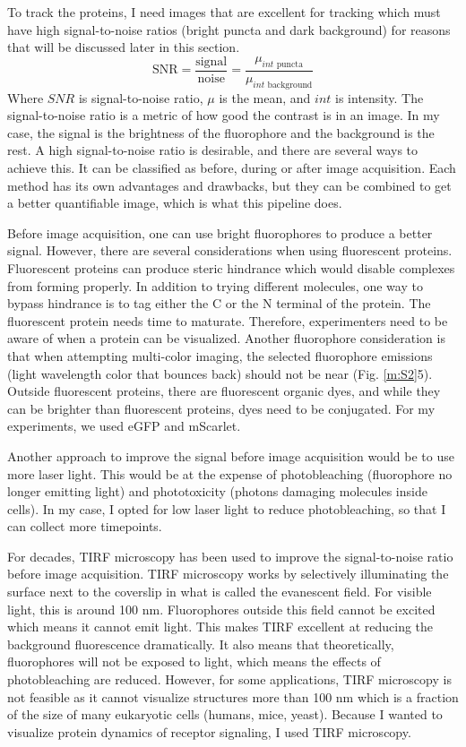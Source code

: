 To track the proteins, I need images that are excellent for tracking which must have high signal-to-noise ratios (bright puncta and dark background) for reasons that will be discussed later in this section.
\begin{equation}
\text{SNR} = \frac{\text{signal}}{\text{noise}} = \frac{\mu_{int\text{ puncta}}}{\mu_{int \text{ background}}}
\end{equation} 
Where $SNR$ is signal-to-noise ratio, $\mu$ is the mean, and $int$ is intensity.
The signal-to-noise ratio is a metric of how good the contrast is in an image. In my case, the signal is the brightness of the fluorophore and the background is the rest. A high signal-to-noise ratio is desirable, and there are several ways to achieve this. It can be classified as before, during or after image acquisition. Each method has its own advantages and drawbacks, but they can be combined to get a better quantifiable image, which is what this pipeline does.

Before image acquisition, one can use bright fluorophores to produce a better signal. However, there are several considerations when using fluorescent proteins. Fluorescent proteins can produce steric hindrance which would disable complexes from forming properly. In addition to trying different molecules, one way to bypass hindrance is to tag either the C or the N terminal of the protein. The fluorescent protein needs time to maturate. Therefore, experimenters need to be aware of when a protein can be visualized. Another fluorophore consideration is that when attempting multi-color imaging, the selected fluorophore emissions (light wavelength color that bounces back) should not be near (Fig. \ref{m:S2}5). Outside fluorescent proteins, there are fluorescent organic dyes, and while they can be brighter than fluorescent proteins, dyes need to be conjugated. For my experiments, we used eGFP and mScarlet.

Another approach to improve the signal before image acquisition would be to use more laser light. This would be at the expense of photobleaching (fluorophore no longer emitting light) and phototoxicity (photons damaging molecules inside cells). In my case, I opted for low laser light to reduce photobleaching, so that I can collect more timepoints.

For decades, TIRF microscopy has been used to improve the signal-to-noise ratio before image acquisition. TIRF microscopy works by selectively illuminating the surface next to the coverslip in what is called the evanescent field. For visible light, this is around 100 nm. Fluorophores outside this field cannot be excited which means it cannot emit light. This makes TIRF excellent at reducing the background fluorescence dramatically. It also means that theoretically, fluorophores will not be exposed to light, which means the effects of photobleaching are reduced. However, for some applications, TIRF microscopy is not feasible as it cannot visualize structures more than 100 nm which is a fraction of the size of many eukaryotic cells (humans, mice, yeast). Because I wanted to visualize protein dynamics of receptor signaling, I used TIRF microscopy.

